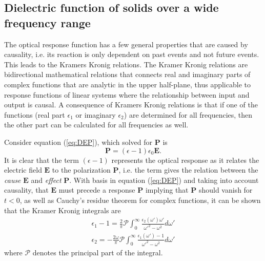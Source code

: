 \subsection{Dielectric function of solids over a wide frequency range}
The optical response function has a few general properties that are caused by causality, i.e. its reaction is only dependent on past events and not future events. This leads to the Kramers Kronig relations\cite{hans_arwin}. The Kramer Kronig relations are bidirectional mathematical relations that connects real and imaginary parts of complex functions that are analytic in the upper half-plane, thus applicable to response functions of linear systems where the relationship between input and output is causal\cite{mathmethodsforphysicists}. A consequence of Kramers Kronig relations is that if one of the functions (real part $\epsilon_1$ or imaginary $\epsilon_2$) are determined for all frequencies, then the other part can be calculated for all frequencies as well.

Consider equation (\ref{eq:DEP}), which solved for  $\mathbf{P}$ is
\begin{equation}
    \mathbf{P} = (\epsilon-1)\epsilon_0 \mathbf{E}.
\end{equation}
It is clear that the term $(\epsilon-1)$ represents the optical response as it relates the electric field $\mathbf{E}$ to the polarization $\mathbf{P}$, i.e. the term gives the relation between the \emph{cause} $\mathbf{E}$ and \emph{effect} $\mathbf{P}$. With basis in equation (\ref{eq:DEP}) and taking into account causality, that $\mathbf{E}$ must precede a response $\mathbf{P}$ implying that $\mathbf{P}$ should vanish for $t<0$, as well as Cauchy's residue theorem for complex functions, it can be shown that the Kramer Kronig integrals are \cite{web:dresselhaus}\cite{hans_arwin}
\begin{subequations}
    \begin{align}
        \epsilon_1 - 1 = \frac{2}{\pi}\mathscr{P}\int_0^\infty\frac{\epsilon_2(\omega')\omega'}{\omega'^2-\omega^2}d\omega'    \\
        \epsilon_2 = -\frac{2\omega}{\pi}\mathscr{P}\int_0^\infty\frac{\epsilon_1(\omega')-1}{\omega'^2-\omega^2}d\omega'
    \end{align}
\end{subequations}
where $\mathscr{P}$ denotes the principal part of the integral.


